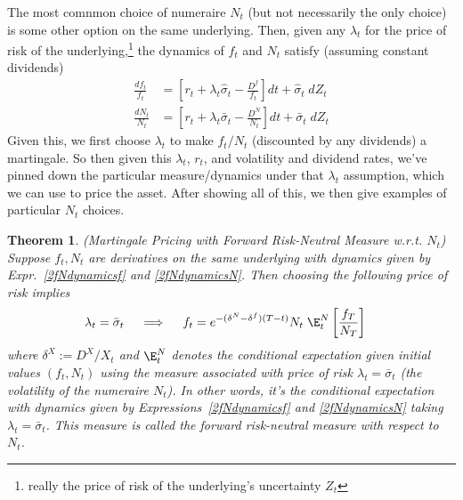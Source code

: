 \documentclass[12pt]{article}
\theoremstyle{plain}
\newtheorem{thm}{Theorem}[section]
\theoremstyle{definition}
\theoremstyle{remark}
\begin{document}
\clearpage
The most comnmon choice of numeraire $N_t$ (but not necessarily the only
choice) is some other option on the same underlying. Then, given any
$\lambda_t$ for the price of risk of the underlying,\footnote{%
  really the price of risk of the underlying's uncertainty $Z_t$
}
the dynamics of $f_t$ and $N_t$ satisfy (assuming constant dividends)
\begin{align}
  \frac{df_{t}}{f_{t}}
  &=
  \left[
    r_t + \lambda_t\hat{\sigma}_t
    - \frac{D^f}{f_t}
  \right]
  dt
  +
  \hat{\sigma}_{t}\;dZ_t
  \label{2fNdynamicsf}
  \\
  \frac{dN_{t}}{N_{t}}
  &=
  \left[
    r_t + \lambda_t\bar{\sigma}_t
    - \frac{D^N}{N_t}
  \right]
  dt
  +
  \bar{\sigma}_{t}\;dZ_t
  \label{2fNdynamicsN}
\end{align}
Given this, we first choose $\lambda_t$ to make $f_t/N_t$ (discounted by
any dividends) a martingale. So then given this $\lambda_t$, $r_t$, and
volatility and dividend rates, we've pinned down the particular
measure/dynamics under that $\lambda_t$ assumption, which we can use to
price the asset.
After showing all of this, we then give examples of particular $N_t$
choices.


\begin{thm}
\emph{(Martingale Pricing with Forward Risk-Neutral Measure w.r.t. $N_t$)}
Suppose $f_t,N_t$ are derivatives on the same underlying with
dynamics given by Expr.~\ref{2fNdynamicsf} and \ref{2fNdynamicsN}.
Then choosing the following price of risk implies
\begin{align}
  \lambda_t = \bar{\sigma}_t
  \quad\implies\quad
  f_t
  &=
  e^{-(\delta^N-\delta^f)(T-t)}
  N_t
  \;
  \E_t^{N}
  \left[
  \frac{f_T}{N_T}
  \right]
  \label{2martprice}
\end{align}
where $\delta^X := D^X/X_t$ and $\E_t^N$ denotes the conditional
expectation given initial values $(f_t,N_t)$ using the measure
associated with price of risk $\lambda_t=\bar{\sigma}_t$ (the volatility
of the numeraire $N_t$).  In other words, it's the conditional
expectation with dynamics given by Expressions~\ref{2fNdynamicsf} and
\ref{2fNdynamicsN} taking $\lambda_t=\bar{\sigma}_t$.
This measure is called the
\emph{forward risk-neutral measure with respect to $N_t$}.
\end{thm}
\end{document}
